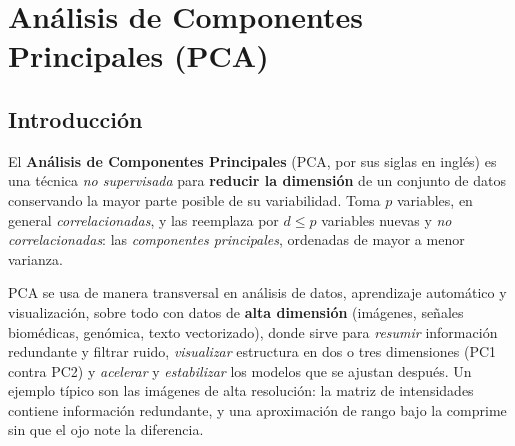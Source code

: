 
\chapter{Análisis de Componentes Principales (PCA)}\label{cap:pca}

\section{Introducción}\label{pca-sec:intro}

El \textbf{Análisis de Componentes Principales} (PCA, por sus siglas en
inglés) es una técnica \emph{no supervisada} para \textbf{reducir la
dimensión} de un conjunto de datos conservando la mayor parte posible de su
variabilidad. Toma $p$ variables, en general \emph{correlacionadas}, y las
reemplaza por $d\le p$ variables nuevas y \emph{no correlacionadas}: las
\emph{componentes principales}, ordenadas de mayor a menor varianza.

PCA se usa de manera transversal en análisis de datos, aprendizaje automático
y visualización, sobre todo con datos de \textbf{alta dimensión} (imágenes,
señales biomédicas, genómica, texto vectorizado), donde sirve para
\emph{resumir} información redundante y filtrar ruido, \emph{visualizar}
estructura en dos o tres dimensiones (PC1 contra PC2) y \emph{acelerar} y
\emph{estabilizar} los modelos que se ajustan después. Un ejemplo típico son
las imágenes de alta resolución: la matriz de intensidades contiene
información redundante, y una aproximación de rango bajo la comprime sin que
el ojo note la diferencia.

